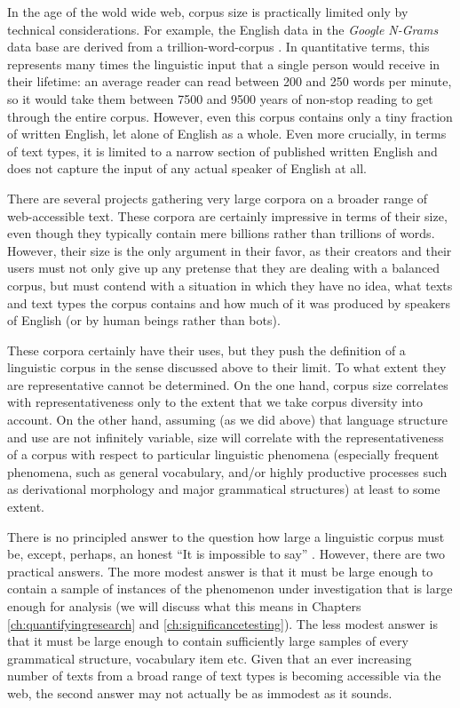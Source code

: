 In the age of the wold wide web, corpus size is practically limited only by technical considerations. For example, the English data in the \emph{Google N-Grams} data base are derived from a trillion-word-corpus \citep[cf.][]{franz_all_2006}. In quantitative terms, this represents many times the linguistic input that a single person would receive in their lifetime: an average reader can read between 200 and 250 words per minute, so it would take them between \num{7500} and \num{9500} years of non-stop reading to get through the entire corpus. However, even this corpus contains only a tiny fraction of written English, let alone of English as a whole. Even more crucially, in terms of text types, it is limited to a narrow section of published written English and does not capture the input of any actual speaker of English at all.

There are several projects gathering very large corpora on a broader range of web-accessible text. These corpora are certainly impressive in terms of their size, even though they typically contain mere billions rather than trillions of words. However, their size is the only argument in their favor, as their creators and their users must not only give up any pretense that they are dealing with a balanced corpus, but must contend with a situation in which they have no idea, what texts and text types the corpus contains and how much of it was produced by speakers of English (or by human beings rather than bots).

These corpora certainly have their uses, but they push the definition of a linguistic corpus in the sense discussed above to their limit. To what extent they are representative cannot be determined. On the one hand, corpus size correlates with representativeness only to the extent that we take corpus diversity into account. On the other hand, assuming (as we did above) that language structure and use are not infinitely variable, size will correlate with the representativeness of a corpus with respect to particular linguistic phenomena (especially frequent phenomena, such as general vocabulary, and/or highly productive processes such as derivational morphology and major grammatical structures) at least to some extent.

There is no principled answer to the question how large a linguistic corpus must be, except, perhaps, an honest ``It is impossible to say'' \citep[130]{renouf_lexical_1987}. However, there are two practical answers. The more modest answer is that it must be large enough to contain a sample of instances of the phenomenon under investigation that is large enough for analysis (we will discuss what this means in Chapters \ref{ch:quantifyingresearch} and \ref{ch:significancetesting}). The less modest answer is that it must be large enough to contain sufficiently large samples of every grammatical structure, vocabulary item etc. Given that an ever increasing number of texts from a broad range of text types is becoming accessible via the web, the second answer may not actually be as immodest as it sounds. 

